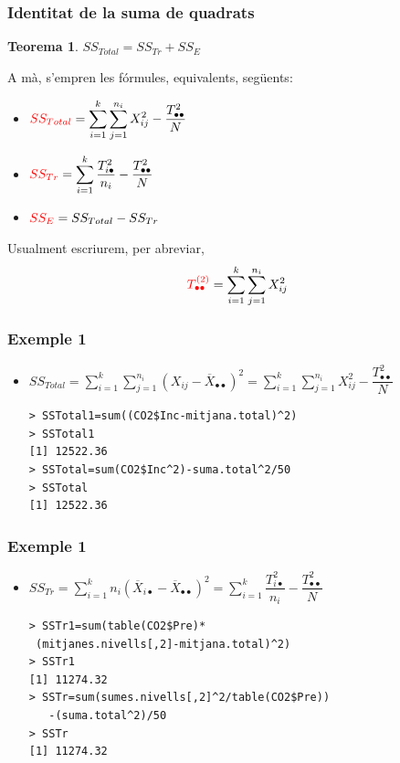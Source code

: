 \documentclass[12pt,t]{beamer}
\newcommand{\red}[1]{\textcolor{red}{#1}}
\theoremstyle{plain}
\newtheorem{teorema}{Teorema}
\theoremstyle{definition}
\begin{document}
\begin{frame}
\frametitle{Identitat de la suma de quadrats}
\begin{teorema}
$SS_{Total}=SS_{Tr}+SS_E$
\end{teorema}

A mà, s'empren les fórmules, equivalents, següents:
\begin{itemize}
\item $\displaystyle \red{SS_{Total}}=\sum_{i=1}^k\sum_{j=1}^{n_i} X_{ij}^2 - \frac{T_{\bullet\bullet}^2}{N}$

\item $\displaystyle \red{SS_{Tr}}=\sum_{i=1}^k \frac{T_{i\bullet}^2}{n_i} -\frac{T_{\bullet\bullet}^2}{N}$  


\item $\red{SS_E}=SS_{Total}-SS_{Tr}$
\end{itemize}
\medskip

Usualment escriurem, per abreviar,
$$
\red{T^{(2)}_{\bullet\bullet}}=\sum\limits_{i=1}^k\sum\limits_{j=1}^{n_i} X_{ij}^2
$$
\end{frame}





\begin{frame}[fragile]
\frametitle{Exemple 1}
\begin{itemize}
\item $SS_{Total}=\sum\limits_{i=1}^k\sum\limits_{j=1}^{n_i} (X_{ij}-\overline{X}_{\bullet\bullet})^2=\sum\limits_{i=1}^k\sum\limits_{j=1}^{n_i} X_{ij}^2 - \dfrac{T_{\bullet\bullet}^2}{N}$
\begin{verbatim}
> SSTotal1=sum((CO2$Inc-mitjana.total)^2)
> SSTotal1
[1] 12522.36
> SSTotal=sum(CO2$Inc^2)-suma.total^2/50
> SSTotal
[1] 12522.36
\end{verbatim}
\end{itemize}
\end{frame}





\begin{frame}[fragile]
\frametitle{Exemple 1}
\begin{itemize}
\item $SS_{Tr}=\sum\limits_{i=1}^k n_i
(\overline{X}_{i\bullet}-\overline{X}_{\bullet\bullet})^2=\sum\limits_{i=1}^k \dfrac{T_{i\bullet}^2}{n_i} -\dfrac{T_{\bullet\bullet}^2}{N}$
\medskip

\hspace*{-3ex}\begin{minipage}{\textwidth}
\begin{verbatim}
> SSTr1=sum(table(CO2$Pre)*
 (mitjanes.nivells[,2]-mitjana.total)^2)
> SSTr1
[1] 11274.32
> SSTr=sum(sumes.nivells[,2]^2/table(CO2$Pre))
   -(suma.total^2)/50
> SSTr 
[1] 11274.32
\end{verbatim}
\end{minipage}
\end{itemize}
\end{frame}
\end{document}
